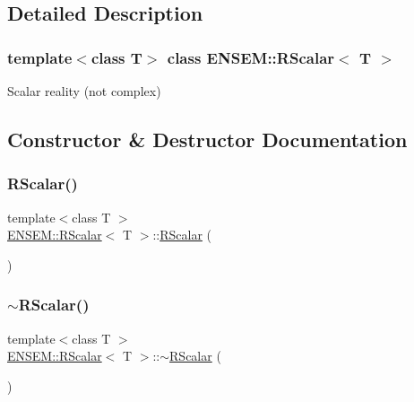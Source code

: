 \subsection{Detailed Description}
\subsubsection*{template$<$class T$>$\newline
class E\+N\+S\+E\+M\+::\+R\+Scalar$<$ T $>$}

Scalar reality (not complex) 

\subsection{Constructor \& Destructor Documentation}
\mbox{\label{classENSEM_1_1RScalar_aef2d18c787b469c86b94f18e711cd556}} 
\subsubsection{\texorpdfstring{RScalar()}{RScalar()}\hspace{0.1cm}{\footnotesize\ttfamily [1/10]}}
{\footnotesize\ttfamily template$<$class T $>$ \\
\mbox{\hyperlink{classENSEM_1_1RScalar}{E\+N\+S\+E\+M\+::\+R\+Scalar}}$<$ T $>$\+::\mbox{\hyperlink{classENSEM_1_1RScalar}{R\+Scalar}} (\begin{DoxyParamCaption}{ }\end{DoxyParamCaption})\hspace{0.3cm}{\ttfamily [inline]}}

\mbox{\label{classENSEM_1_1RScalar_a6508c0b6ff5db38e53a19f0d376dde49}} 
\subsubsection{\texorpdfstring{$\sim$RScalar()}{~RScalar()}\hspace{0.1cm}{\footnotesize\ttfamily [1/2]}}
{\footnotesize\ttfamily template$<$class T $>$ \\
\mbox{\hyperlink{classENSEM_1_1RScalar}{E\+N\+S\+E\+M\+::\+R\+Scalar}}$<$ T $>$\+::$\sim$\mbox{\hyperlink{classENSEM_1_1RScalar}{R\+Scalar}} (\begin{DoxyParamCaption}{ }\end{DoxyParamCaption})\hspace{0.3cm}{\ttfamily [inline]}}

